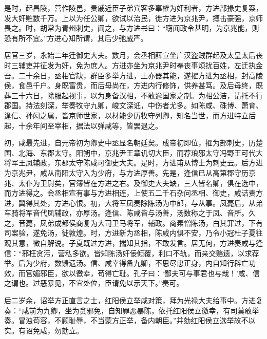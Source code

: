 \documentclass[12pt,UTF8]{ctexbook}
\begin{document}
是时，起昌陵，营作陵邑，贵戚近臣子弟宾客多辜榷为奸利者，方进部掾史复案，发大奸赃数千万。上以为任公卿，欲试以治民，徙方进为京兆尹，搏击豪强，京师畏之。时，胡常为青州刺史，闻之，与方进书曰：“窃闻政令甚明，为京兆能，则恐有所不宜。”方进心知所谓，其后少弛威严。



居官三岁，永始二年迁御史大夫。数月，会丞相薛宣坐广汉盗贼群起及太皇太后丧时三辅吏并征发为奸，免为庶人。方进亦坐为京兆尹时奉丧事烦扰百姓，左迁执金吾。二十余日，丞相官缺，群臣多举方进，上亦器其能，遂擢方进为丞相，封高陵侯，食邑千户。身既富贵，而后母尚在，方进内行修饰，供养甚笃。及后母终，既葬三十六日，除服起视事，以为身备汉相，不敢逾国家之制。为相公洁，请托不行郡国。持法刻深，举奏牧守九卿，峻文深诋，中伤者尤多。如陈咸、硃博、萧育、逢信、孙闳之属，皆京师世家，以材能少历牧守列卿，知名当世，而方进特立后起，十余年间至宰相，据法以弹咸等，皆罢退之。



初，咸最先进，自元帝初为卿史中丞显名朝廷矣。成帝初即位，擢为部刺史，历楚国、北海、东郡太守。阳朔中，京兆尹王章讥切大臣，而荐琅邪太守冯野王可代大将军王凤辅政，东郡太守陈咸可御史大夫。是时，方进甫从博士为刺史云。后方进为京兆尹，咸从南阳太守入为少府，与方进厚善。先是，逢信已从高第郡守历京兆、太仆为卫尉矣，官簿皆在方进之右。及御史大夫缺，三人皆名卿，俱在选中，而方进得之。会丞相宣有事与方进相连，上使五二千石杂问丞相、御史，咸诘责方进，冀得其处，方进心恨。初，大将军凤奏除陈汤为中郎，与从事。凤薨后，从弟车骑将军音代凤辅政，亦厚汤。逢信、陈咸皆与汤善，汤数称之于凤、音所。久之，音薨，凤弟成都侯商复为大司卫马将军，辅政。商素憎陈汤，白其罪过，下有司案验，遂免汤，徙敦煌。时，方进新为丞相，陈咸内惧不安，乃令小冠杜子夏往观其意，微自解说。子夏既过方进，揣知其指，不敢发言。居无何，方进奏咸与逢信：“邪枉贪污，营私多欲。皆知陈汤奸佞倾覆，利口不轨，而亲交赂遗，以求荐举。后为少府，数馈遗汤。信、咸幸得备九卿，不思尽忠正身，内自知行辟亡功效，而官媚邪臣，欲以徼幸，苟得亡耻。孔子曰：‘鄙夫可与事君也与哉！’咸、信之谓也。过恶暴见，不宜处位，臣请免以示天下。”奏可。



后二岁余，诏举方正直言之士，红阳侯立举咸对策，拜为光禄大夫给事中。方进复奏：“咸前为九卿，坐为贪邪免，自知罪恶暴陈，依托红阳侯立徼幸，有司莫敢举奏。冒浊苟容，不顾耻辱，不当蒙方正举，备内朝臣。”并劾红阳侯立选举故不以实。有诏免咸，勿劾立。
\end{document}
